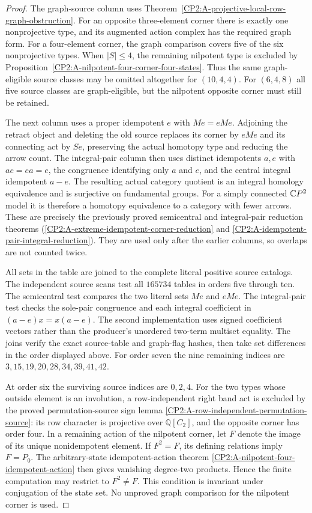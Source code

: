 \begin{proof}
The graph-source column uses
Theorem~\ref{CP2:A-projective-local-row-graph-obstruction}.  For an opposite
three-element corner there is exactly one nonprojective type, and its
augmented action complex has the required graph form.  For a four-element
corner, the graph comparison covers five of the six nonprojective types.
When $|S|\le4$, the remaining nilpotent type is excluded by
Proposition~\ref{CP2:A-nilpotent-four-corner-four-states}.  Thus the same
graph-eligible source classes may be omitted altogether for $(10,4,4)$.
For $(6,4,8)$ all five source classes are graph-eligible, but the nilpotent
opposite corner must still be retained.

The next column uses a proper idempotent $e$ with $Me=eMe$.  Adjoining the
retract object and deleting the old source replaces its corner by $eMe$ and
its connecting act by $Se$, preserving the actual homotopy type and reducing
the arrow count.  The integral-pair column then uses distinct idempotents
$a,e$ with $ae=ea=e$, the congruence identifying only $a$ and $e$, and the
central integral idempotent $a-e$.  The resulting actual category quotient
is an integral homology equivalence and is surjective on fundamental groups.
For a simply connected $\mathbb{C}P^2$ model it is therefore a homotopy equivalence
to a category with fewer arrows.  These are precisely the previously proved
semicentral and integral-pair reduction theorems
(\ref{CP2:A-extreme-idempotent-corner-reduction} and
\ref{CP2:A-idempotent-pair-integral-reduction}).  They are used only after
the earlier columns, so overlaps are not counted twice.

All sets in the table are joined to the complete literal positive source
catalogs.  The independent source scans test all $165734$ tables in orders
five through ten.  The semicentral test compares the two literal sets
$Me$ and $eMe$.  The integral-pair test checks the sole-pair congruence and
each integral coefficient in $(a-e)x=x(a-e)$.  The second implementation
uses signed coefficient vectors rather than the producer's unordered
two-term multiset equality.  The joins verify the exact source-table and
graph-flag hashes, then take set differences in the order displayed above.
For order seven the nine remaining indices are
$3,15,19,20,28,34,39,41,42$.

At order six the surviving source indices are $0,2,4$.  For the two types
whose outside element is an involution, a row-independent right band act is
excluded by the proved permutation-source sign lemma
\ref{CP2:A-row-independent-permutation-source}: its row character is
projective over $\mathbb Q[C_2]$, and the opposite corner has order four.
In a remaining action of the nilpotent corner, let $F$ denote the image of
its unique nonidempotent element.  If $F^2=F$, its defining relations imply
$F=P_0$.  The arbitrary-state idempotent-action theorem
\ref{CP2:A-nilpotent-four-idempotent-action} then gives vanishing
degree-two products.  Hence the finite computation may restrict to
$F^2\ne F$.  This condition is invariant under conjugation of the state set.
No unproved graph comparison for the nilpotent corner is used.
\end{proof}

